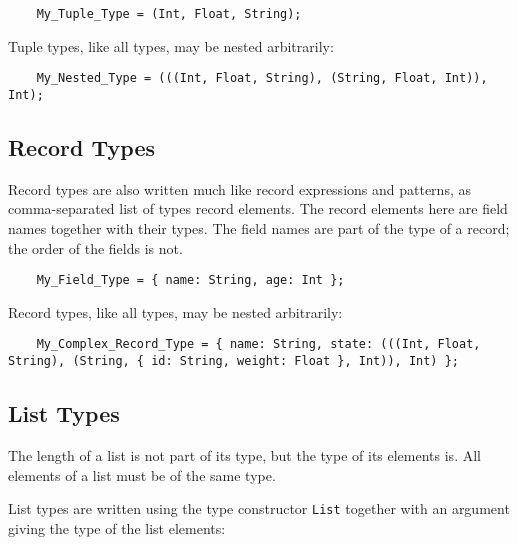 \begin{verbatim}
    My_Tuple_Type = (Int, Float, String);
\end{verbatim}

Tuple types, like all types, may be nested arbitrarily:

\begin{verbatim}
    My_Nested_Type = (((Int, Float, String), (String, Float, Int)), Int);
\end{verbatim}

\cutend*


\subsection{Record Types}
\label{section:ref:types:record-types}

Record types are also written much like record expressions 
and patterns, as comma-separated list of types record elements. 
The record elements here are field names together with their 
types.  The field names are part of the type of a record; the 
order of the fields is not.

\begin{verbatim}
    My_Field_Type = { name: String, age: Int };
\end{verbatim}

Record types, like all types, may be nested arbitrarily:

\begin{verbatim}
    My_Complex_Record_Type = { name: String, state: (((Int, Float, String), (String, { id: String, weight: Float }, Int)), Int) };
\end{verbatim}

\cutend*

\subsection{List Types}
\label{section:ref:types:list-types}

The length of a list is not part of its type, but the type 
of its elements is.  All elements of a list must be of the 
same type.

List types are written using the type 
constructor {\tt List} together with an argument giving 
the type of the list elements:

